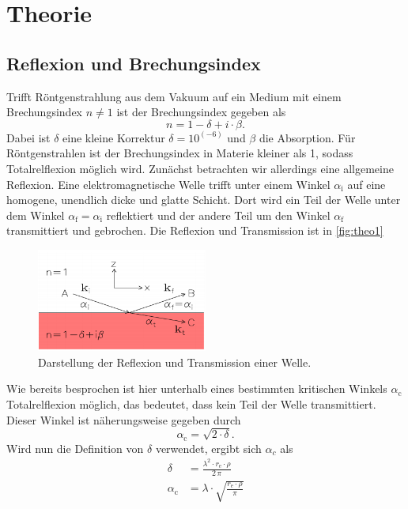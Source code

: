 \section{Theorie}
\label{sec:Theorie}

\subsection{Reflexion und Brechungsindex}
\label{theo1}

Trifft Röntgenstrahlung aus dem Vakuum auf ein Medium mit einem Brechungsindex $n \neq 1$ ist der Brechungsindex gegeben als
\begin{equation}
    n = 1 −  \delta + i \cdot \beta.
    \label{eq:index}
\end{equation}
Dabei ist $\delta$ eine kleine Korrektur $\delta = 10^(-6)$ und $\beta$ die Absorption.
Für Röntgenstrahlen ist der Brechungsindex in Materie kleiner als 1, sodass Totalrelflexion möglich wird.
Zunächst betrachten wir allerdings eine allgemeine Reflexion.
Eine elektromagnetische Welle trifft unter einem Winkel $\alpha_\text{i}$ auf eine homogene, unendlich dicke und glatte Schicht.
Dort wird ein Teil der Welle unter dem Winkel $\alpha _\text{f} = \alpha _\text{i}$ reflektiert und der andere Teil um den Winkel $\alpha _\text{f}$ transmittiert und gebrochen.
Die Reflexion und Transmission ist in \autoref{fig:theo1}

\begin{figure}
    \centering
    \includegraphics[width=0.5\textwidth]{images/reflektion.png}
    \caption{Darstellung der Reflexion und Transmission einer Welle. \cite{V44-old}}
    \label{fig:theo1}
\end{figure}

Wie bereits besprochen ist hier unterhalb eines bestimmten kritischen Winkels $\alpha _\text{c}$ Totalrelflexion möglich, das bedeutet, dass kein Teil der Welle transmittiert.
Dieser Winkel ist näherungsweise gegeben durch
\begin{equation}
    \alpha _\text{c} = \sqrt{2 \cdot \delta}.
    \label{eq:krit}
\end{equation}
Wird nun die Definition von $\delta$ verwendet, ergibt sich $\alpha _c$ als 
\begin{align}
    \delta &= \frac{\lambda ^2 \cdot r_\text{e} \cdot \rho}{2 \, \pi} \\
    \alpha _\text{c} &=  \lambda  \cdot \sqrt{\frac{r_\text{e} \cdot \rho}{\pi}}
\end{align}


